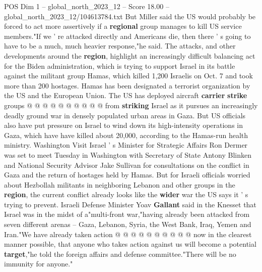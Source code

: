 \begin{textsample}{POS Dim 1 – global\_north\_2023\_12 – Score 18.00 – global\_north\_2023\_12/104613784.txt}
But Miller said the US would probably be forced to act more assertively if a \textbf{regional} group manages to kill US service members."If we ' re attacked directly and Americans die, then there ' s going to have to be a much, much heavier response,"he said.
The attacks, and other developments around the \textbf{region}, highlight an increasingly difficult balancing act for the Biden administration, which is trying to support Israel in its battle against the militant group Hamas, which killed 1,200 Israelis on Oct. 7 and took more than 200 hostages.
Hamas has been designated a terrorist organization by the US and the European Union.
The US has deployed aircraft \textbf{carrier} \textbf{strike} groups @ @ @ @ @ @ @ @ @ @ from \textbf{striking} Israel as it pursues an increasingly deadly ground war in densely populated urban areas in Gaza.
But US officials also have put pressure on Israel to wind down its high-intensity operations in Gaza, which have have killed about 20,000, according to the Hamas-run health ministry.
Washington Visit Israel ' s Minister for Strategic Affairs Ron Dermer was set to meet Tuesday in Washington with Secretary of State Antony Blinken and National Security Advisor Jake Sullivan for consultations on the conflict in Gaza and the return of hostages held by Hamas.
But for Israeli officials worried about Hezbollah militants in neighboring Lebanon and other groups in the \textbf{region}, the current conflict already looks like the \textbf{wider} war the US says it ' s trying to prevent.
Israeli Defense Minister Yoav \textbf{Gallant} said in the Knesset that Israel was in the midst of a"multi-front war,"having already been attacked from seven different arenas -- Gaza, Lebanon, Syria, the West Bank, Iraq, Yemen and Iran."We have already taken action @ @ @ @ @ @ @ @ @ @ now in the clearest manner possible, that anyone who takes action against us will become a potential \textbf{target},"he told the foreign affairs and defense committee."There will be no immunity for anyone."

\end{textsample}
